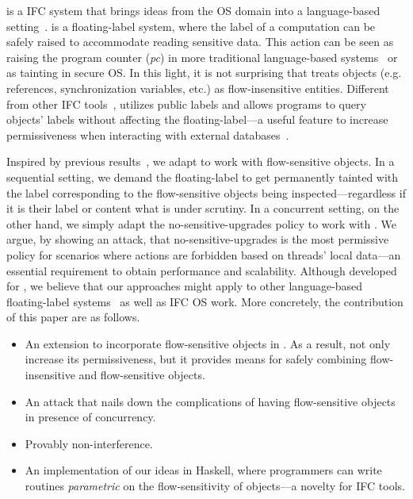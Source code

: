 {\LIO} is a IFC system that brings ideas from the OS domain into a language-based
setting~\citep{stefan:lio,stefan:addressing-covert}.  {\LIO} is a floating-label
system, where the label of a computation can be safely raised to accommodate
reading sensitive data. This action can be seen as raising the program counter
(\emph{pc}) in more traditional language-based
systems~\citep{sabelfeld:language-based-iflow} or as tainting in secure OS.  In
this light, it is not surprising that {\LIO} treats objects (e.g. references,
synchronization variables, etc.) as flow-insensitive entities. Different from
other IFC tools~\citep{jif,FlowCaml,Hedin13}, {\LIO} utilizes public labels and
allows programs to query objects' labels without affecting the
floating-label---a useful feature to increase permissiveness when interacting
with external databases~\citep{giffin:hails}.

Inspired by previous results~\citep{Austin:Flanagan:PLAS10}, we adapt {\LIO} to
work with flow-sensitive objects. In a sequential setting, we demand the
floating-label to get permanently tainted with the label corresponding to the
flow-sensitive objects being inspected---regardless if it is their label or
content what is under scrutiny. In a concurrent setting, on the other hand, we
simply adapt the no-sensitive-upgrades policy to work with \LIO. We argue, by
showing an attack, that no-sensitive-upgrades is the most permissive policy for
scenarios where actions are forbidden based on threads' local data---an
essential requirement to obtain performance and scalability. Although developed
for {\LIO}, we believe that our approaches might apply to other language-based
floating-label systems~\citep[e.g.][]{10.1109/SP.2013.10} as well as IFC OS
work.  More concretely, the contribution of this paper are as follows.
\begin{itemize}

\item An extension to incorporate flow-sensitive objects in {\LIO}. As a result,
  not only increase {\LIO} its permissiveness, but it provides means for safely
  combining flow-insensitive and flow-sensitive objects.


\item An attack that nails down the complications of having flow-sensitive
  objects in presence of concurrency.

\item Provably non-interference. 

\item An implementation of our ideas in Haskell, where programmers can write
  routines \emph{parametric} on the flow-sensitivity of objects---a novelty for IFC
  tools. 
\end{itemize}

